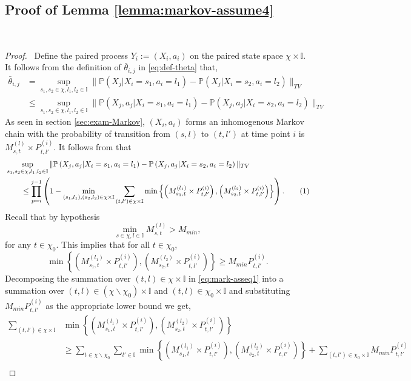 \documentclass[opre,sglanonrev]{informs4}
\numberwithin{equation}{section}
\newcommand{\pow}[1]{^{(#1)}}
\newcommand{\lp}{\left(}
\newcommand{\rp}{\right)}
\newcommand{\lc}{\left\{}
\newcommand{\rc}{\right\}}
\newcommand{\Ibb}{\mathbb{I}}
\newcommand{\Pbb}{\mathbb{P}}
\newcommand\numberthis{\addtocounter{equation}{1}\tag{\theequation}}
\newcommand{\prob}{\Pbb}
\newcommand{\probl}{\prob}
\begin{document}
\begin{APPENDICES}
\subsection{Proof of Lemma \ref{lemma:markov-assume4}}~\label{sec:prf-mkvass4}
\begin{proof}\ 
Define the paired process $Y_i:=(X_i,a_i)$ on the paired state space $\chi\times \Ibb$. It follows from the definition of $\bar \theta_{i,j}$ in \cref{eq:def-theta} that,
\begin{align*}
\bar\theta_{i,j} & = \sup_{s_1,s_2\in\chi,l_1,l_2\in \Ibb}\| \probl\lp X_j|X_i=s_1,a_i=l_1\rp-\probl\lp X_j|X_i=s_2,a_i=l_2\rp \|_{TV}\\
&\leq  \sup_{s_1,s_2\in\chi,l_1,l_2\in \Ibb}\| \probl\lp X_j,a_j|X_i=s_1,a_i=l_1\rp-\probl\lp X_j,a_j|X_i=s_2,a_i=l_2\rp \|_{TV}
\end{align*}
As seen in section \ref{sec:exam-Markov}, $(X_i,a_i)$ forms an inhomogenous Markov chain with the probability of transition from $(s,l)$ to $(t,l')$ at time point $i$ is $M_{s,t}^{(l)}\times P_{t,l'}^{(i)}$. 
It follows from \citet[Theorem 2]{hajnal1958weak} that
\begin{align*}
& \sup_{s_1,s_2\in\chi,l_1,l_2\in \Ibb}\| \probl\lp X_j,a_j|X_i=s_1,a_i=l_1\rp-\probl\lp X_j,a_j|X_i=s_2,a_i=l_2\rp \|_{TV}\\
& \qquad \leq \prod_{p=i}^{j-1}\lp 1-\min_{(s_1,l_1),(s_2,l_2)\in\chi\times\Ibb}\sum_{(t,l')\in \chi\times\Ibb} \min\lc \lp M_{s_1,t}^{(l_1)}\times P_{t,l'}\pow{i}\rp,\lp M_{s_2,t}^{(l_2)}\times P_{t,l'}\pow{i}\rp \rc\rp.\numberthis\label{eq:mark-asseq1}
\end{align*}
Recall that by hypothesis
\[
\min_{s\in\chi,l\in\Ibb} M_{s,t}\pow{l}>M_{min},
\]
for any $t\in\chi_0$.
This implies that for all $t\in\chi_0$,
\[
\min\lc \lp M_{s_1,t}^{(l_1)}\times P_{t,l'}\pow{i}\rp,\lp M_{s_2,t}^{(l_2)}\times P_{t,l'}\pow{i}\rp \rc\geq M_{min} P_{t,l'}\pow{i}.
\]
Decomposing the summation over $(t,l)\in\chi\times\Ibb$ in \cref{eq:mark-asseq1} into a summation over $(t,l)\in(\chi\backslash\chi_0)\times\Ibb$ and $(t,l)\in \chi_0\times\Ibb$ and substituting $ M_{min} P_{t,l'}\pow{i}$ as the appropriate lower bound we get,
\begin{align*}
    \sum_{(t,l')\in \chi\times\Ibb} & \min\lc \lp M_{s_1,t}^{(l_1)}\times P_{t,l'}\pow{i}\rp,\lp M_{s_2,t}^{(l_2)}\times P_{t,l'}\pow{i}\rp \rc \\
    & \geq \sum_{t\in\chi\backslash\chi_0} \sum_{l'\in \Ibb}\min\lc \lp M_{s_1,t}^{(l_1)}\times P_{t,l'}\pow{i}\rp,\lp M_{s_2,t}^{(l_2)}\times P_{t,l'}\pow{i}\rp \rc+\sum_{(t,l')\in\chi_0\times \Ibb}  M_{min} P_{t,l'}\pow{i}\\

\end{align*}
\end{proof}
\end{APPENDICES}
\end{document}
